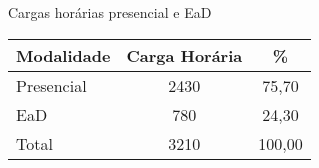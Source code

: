 \begin{quadro}[ht!]
\caption{Cargas horárias presencial e EaD }
\label{quad:ead}
\centering
\begin{tabular}{|l|c|c|}
\hline
\rowcolor{blue1}
 Modalidade &    Carga Horária  & \%\\
\hline
Presencial & 2430 & 75,70 \\
EaD & 780 & 24,30 \\
\hline
Total  & 3210 & 100,00\\\hline
\end{tabular}
\end{quadro}